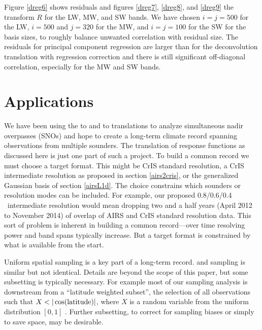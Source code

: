 \documentclass[journal]{IEEEtran}
\begin{document}
Figure \ref{dreg6} shows residuals and figures \ref{dreg7},
\ref{dreg8}, and \ref{dreg9} the transform $R$ for the {\cris} LW,
MW, and SW bands.  We have chosen $i = j = 500$ for the LW, $i =
500$ and $j = 320$ for the MW, and $i = j = 100$ for the SW for the
basis sizes, to roughly balance unwanted correlation with residual
size.  The residuals for principal component regression are larger
than for the deconvolution translation with regression correction
and there is still significant off-diagonal correlation, especially
for the MW and SW bands.

\section{Applications}  
\label{appcon}

We have been using the {\airs} to {\cris} and {\iasi} to {\cris}
translations to analyze simultaneous nadir overpasses (SNOs)
\cite{wang2015, sno1} and hope to create a long-term climate record
spanning observations from multiple sounders.  The translation of
response functions as discussed here is just one part of such a
project.  To build a common record we must choose a target format.
This might be CrIS standard resolution, a CrIS intermediate
resolution as proposed in section \ref{airs2cris}, or the
generalized Gaussian basis of section \ref{airsL1d}.  The choice
constrains which sounders or resolution modes can be included.  For
example, our proposed {\cris} 0.8/0.6/0.4 \wn\ intermediate
resolution would mean dropping two and a half years (April 2012 to
November 2014) of overlap of AIRS and CrIS standard resolution data.
This sort of problem is inherent in building a common record---over
time resolving power and band spans typically increase.  But a
target format is constrained by what is available from the start.

Uniform spatial sampling is a key part of a long-term record.
{\airs} and {\cris} sampling is similar but not identical.  Details
are beyond the scope of this paper, but some subsetting is typically
necessary.  For example most of our sampling analysis is downstream
from a ``latitude weighted subset'', the selection of all
observations such that $X < |\cos(\hbox{latitude})|$, where $X$ is a
random variable from the uniform distribution $[0, 1]$
\cite{git:acsamp}.  Further subsetting, to correct for sampling
biases or simply to save space, may be desirable.
\end{document}
